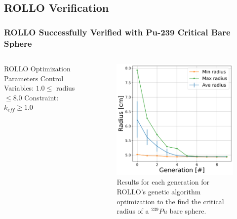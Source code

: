 \subsection{ROLLO Verification}
\begin{frame}
    \frametitle{ROLLO Successfully Verified with Pu-239 Critical Bare Sphere}
    \begin{columns}
        \begin{column}{0.5\textwidth} 
            \begin{block}{ROLLO Optimization Parameters}
                Control Variables: $1.0 \leq$ radius $ \leq 8.0$ 
                Constraint: $k_{eff} \geq 1.0$
            \end{block}
        \end{column}
        \begin{column}{0.5\textwidth}
            \begin{figure}
                \includegraphics[width=0.9\linewidth]{figures/radius-convergence-pres.png} 
                \caption{Results for each generation for \gls{ROLLO}'s genetic algorithm 
                optimization to the find the critical radius of a  $^{239}Pu$ bare sphere.}
            \end{figure}
        \end{column}
        \end{columns}
\end{frame}

